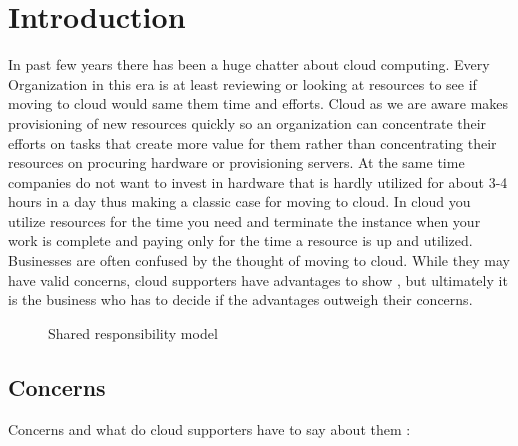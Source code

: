 \chapter{Introduction}\label{chap:introduction}
In past few years there has been a huge chatter about cloud computing. Every Organization in this era is at least reviewing or looking at resources to see if moving to cloud would same them time and efforts. Cloud as we are aware makes provisioning of new resources quickly so an organization can concentrate their efforts on tasks that create more value for them rather than concentrating their resources on procuring hardware or provisioning servers. At the same time companies do not want to invest in hardware that is hardly utilized for about 3-4 hours in a day thus making a classic case for moving to cloud. In cloud you utilize resources for the time you need and terminate the instance when your work is complete and paying only for the time a resource is up and utilized. 
\\

Businesses are often confused by the thought of moving to cloud. While they may have valid concerns, cloud supporters have advantages to show , but ultimately it is the business who has to decide if the advantages outweigh their concerns.\cite{MTechLabs}
\begin{figure}[!htb]
    \caption{\label{fig:shared_responsibility_model} Shared responsibility model}\cite{SecurityModel}
\end{figure}

\section{Concerns}
Concerns  and what do cloud supporters have to say about them : 


